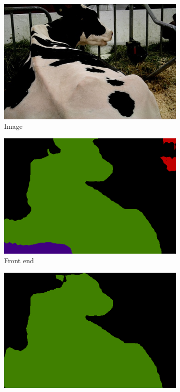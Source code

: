 \documentclass{article} %
\begin{document}
\begin{figure}[t]
  \begin{subfigure}[b]{0.19\linewidth}
    \includegraphics[width=\textwidth]{figs/ab/img/2007_000491}
	\caption{Image}
  \end{subfigure}
  \begin{subfigure}[b]{0.19\linewidth}
    \includegraphics[width=\textwidth]{figs/ab/step8/2007_000491}
	\caption{Front end}
  \end{subfigure}
  \begin{subfigure}[b]{0.19\linewidth}
    \includegraphics[width=\textwidth]{figs/ab/context/2007_000491}

\end{subfigure}
\end{figure}
\end{document}
